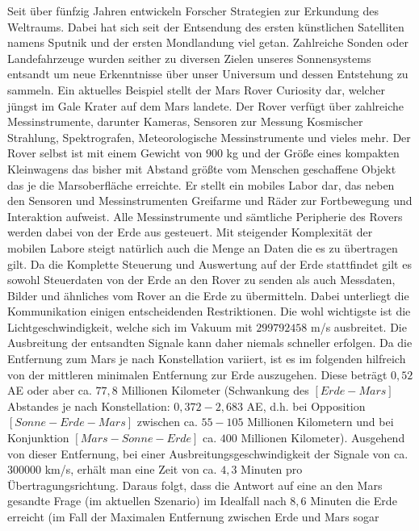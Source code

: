 Seit {\"u}ber f{\"u}nfzig Jahren entwickeln Forscher Strategien zur Erkundung
des Weltraums. Dabei hat sich seit der Entsendung des ersten k{\"u}nstlichen
Satelliten namens Sputnik und der ersten Mondlandung viel getan.
Zahlreiche Sonden oder Landefahrzeuge wurden seither zu diversen Zielen unseres
Sonnensystems entsandt um neue Erkenntnisse {\"u}ber unser Universum und dessen
Entstehung zu sammeln. Ein aktuelles Beispiel stellt der Mars Rover Curiosity
dar, welcher j{\"u}ngst im Gale Krater auf dem Mars landete. Der Rover
verf{\"u}gt {\"u}ber zahlreiche Messinstrumente, darunter Kameras, Sensoren zur
Messung Kosmischer Strahlung, Spektrografen, Meteorologische Messinstrumente und
vieles mehr. Der Rover selbst ist mit einem Gewicht von $900$ kg und der
Gr{\"o}{\ss}e eines kompakten Kleinwagens das bisher mit Abstand gr{\"o}{\ss}te
vom Menschen geschaffene Objekt das je die Marsoberfl{\"a}che erreichte. Er
stellt ein mobiles Labor dar, das neben den Sensoren und Messinstrumenten
Greifarme und R{\"a}der zur Fortbewegung und Interaktion aufweist. Alle
Messinstrumente und s{\"a}mtliche Peripherie des Rovers werden dabei von der
Erde aus gesteuert. Mit steigender Komplexit{\"a}t der mobilen Labore
steigt nat{\"u}rlich auch die Menge an Daten die es zu {\"u}bertragen gilt. Da
die Komplette Steuerung und Auswertung auf der Erde stattfindet gilt es sowohl
Steuerdaten von der Erde an den Rover zu senden als auch Messdaten, Bilder und
{\"a}hnliches vom Rover an die Erde zu {\"u}bermitteln. Dabei unterliegt die
Kommunikation einigen entscheidenden Restriktionen. Die wohl wichtigste ist die
Lichtgeschwindigkeit, welche sich im Vakuum mit $299 792 458$ m/s ausbreitet.
Die Ausbreitung der entsandten Signale kann daher niemals schneller erfolgen. Da die
Entfernung zum Mars je nach Konstellation variiert, ist es im folgenden
hilfreich von der mittleren minimalen Entfernung zur Erde auszugehen. Diese
betr{\"a}gt $0,52$ AE oder aber ca. $77,8$ Millionen Kilometer (Schwankung des
$[Erde - Mars]$ Abstandes je nach Konstellation: $0,372 - 2,683$ AE, d.h. bei
Opposition $[Sonne - Erde - Mars]$ zwischen ca. $55 - 105$ Millionen Kilometern
und bei Konjunktion $[Mars - Sonne - Erde]$ ca. $400$ Millionen Kilometer).
Ausgehend von dieser Entfernung, bei einer Ausbreitungsgeschwindigkeit der
Signale von ca. $300 000$ km/s, erh{\"a}lt man eine Zeit von ca. $4,3$ Minuten
pro {\"U}bertragungsrichtung. Daraus folgt, dass die Antwort auf eine an den
Mars gesandte Frage (im aktuellen Szenario) im Idealfall nach $8,6$ Minuten die
Erde erreicht (im Fall der Maximalen Entfernung zwischen Erde und Mars sogar
